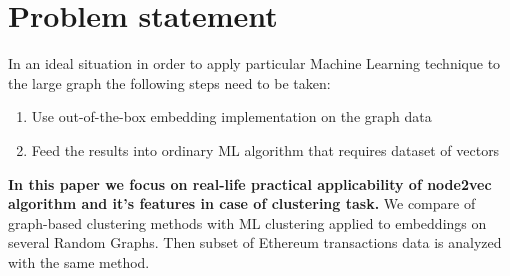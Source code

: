 \section{Problem statement}
In an ideal situation in order to apply particular Machine Learning technique to the large graph the following steps need to be taken:
\begin{enumerate}
\item Use out-of-the-box embedding implementation on the graph data
\item Feed the results into ordinary ML algorithm that requires dataset of vectors
\end{enumerate}

\textbf{In this paper we focus on real-life practical applicability of node2vec algorithm and it's features in case of clustering task.} We compare of graph-based clustering methods with ML clustering applied to embeddings on several Random Graphs. Then subset of Ethereum transactions data is analyzed with the same method.